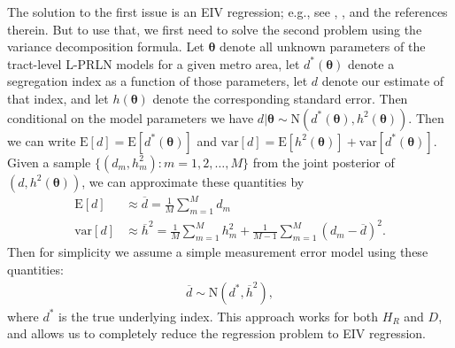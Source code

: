 \documentclass[12pt]{article}
\newcommand{\E}{\mathrm{E}}
\newcommand{\var}{\mathrm{var}}
\begin{document}
The solution to the first issue is an EIV regression; e.g., see \citet{carroll2006measurement}, \citet{arima2015bayesian}, and the references therein. But to use that, we first need to solve the second problem using the variance decomposition formula. Let $\bm{\theta}$ denote all unknown parameters of the tract-level L-PRLN models for a given metro area, let $d^*(\bm{\theta})$ denote a segregation index as a function of those parameters, let $d$ denote our estimate of that index, and let $h(\bm{\theta})$ denote the corresponding standard error. Then conditional on the model parameters we have $d|\bm{\theta} \sim \mathrm{N}(d^*(\bm{\theta}), h^2(\bm{\theta}))$.
Then we can write $\E[d] = \E[d^*(\bm{\theta})]$ and $\var[d] = \E[h^2(\bm{\theta})] + \var[d^*(\bm{\theta})]$.
Given a sample $\{(d_m, h_m^2): m=1,2,\dots,M\}$ from the joint posterior of $(d, h^2(\bm{\theta}))$, we can approximate these quantities by
\begin{align*}
  \E[d] &\approx \overline{d} = \frac{1}{M}\sum_{m=1}^Md_m\\
  \var[d] &\approx \overline{h}^2 = \frac{1}{M}\sum_{m=1}^Mh^2_m + \frac{1}{M-1}\sum_{m=1}^M(d_m - \overline{d})^2.
\end{align*}
Then for simplicity we assume a simple measurement error model using these quantities:
\begin{align*}
\overline{d} \sim \mathrm{N}(d^*, \overline{h}^2),
\end{align*}
where $d^*$ is the true underlying index. This approach works for both $H_R$ and $D$, and allows us to completely reduce the regression problem to EIV regression.
\end{document}
